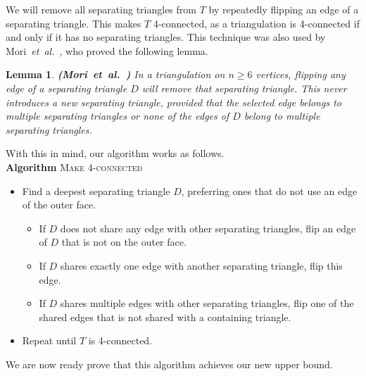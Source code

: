 \pdfoutput=1 \documentclass[12pt]{elsarticle}
\newtheorem{lem}[defin]{Lemma}
\newenvironment{lemma}{\begin{lem} \sl}{\end{lem}}
\newcommand{\etal}{\emph{et~al.}\xspace}
\newcommand{\from}[1]{{\emph{\textbf{(#1)}}}}
\begin{document}
We will remove all separating triangles from $T$ by repeatedly flipping an edge of a separating triangle. This makes $T$ 4-connected, as a triangulation is 4-connected if and only if it has no separating triangles. This technique was also used by Mori~\etal~\cite{mori2003diagonal}, who proved the following lemma.

\begin{lemma}
 \label{lem:flip}
 \from{Mori~\etal~\cite{mori2003diagonal}}
 In a triangulation on $n \geq 6$ vertices, flipping any edge of a separating triangle $D$ will remove that separating triangle. This never introduces a new separating triangle, provided that the selected edge belongs to multiple separating triangles or none of the edges of $D$ belong to multiple separating triangles.
\end{lemma}

\noindent With this in mind, our algorithm works as follows.
\\[0.6\baselineskip]
\noindent\textbf{Algorithm} \textsc{Make 4-connected}
\vspace{-0.6\baselineskip}
\begin{itemize}
 \renewcommand{\labelitemii}{$\circ$}
 \setlength{\itemsep}{-0.6\baselineskip}
 \item Find a deepest separating triangle $D$, preferring ones that do not use an edge of the outer face.
 \vspace{-0.6\baselineskip}
 \begin{itemize}
 \setlength{\itemsep}{-4pt}
 \item If $D$ does not share any edge with other separating triangles, flip an edge of $D$ that is not on the outer face.
 \item If $D$ shares exactly one edge with another separating triangle, flip this edge.
 \item If $D$ shares multiple edges with other separating triangles, flip one of the shared edges that is not shared with a containing triangle.
 \end{itemize}
 \item Repeat until $T$ is 4-connected.
\end{itemize}

\noindent We are now ready prove that this algorithm achieves our new upper bound.
\end{document}

